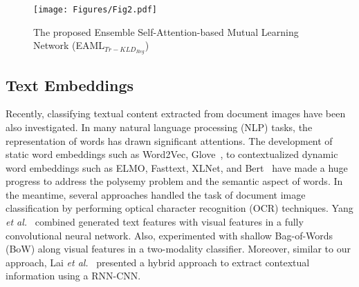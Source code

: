 \documentclass[twocolumn]{svjour3}
\newcommand{\etal}{\textit{et al.}}
\begin{document}
\begin{figure*}[ht]
\centering
  \texttt{[image: Figures/Fig2.pdf]}
  \caption{The proposed Ensemble Self-Attention-based Mutual Learning Network (EAML$_{{Tr-KLD}_{Reg}}$)}
    \label{fig:DAPML_architecture}
\end{figure*}


\subsection{Text Embeddings}

Recently, classifying textual content extracted from document images have been also investigated. In many natural language processing (NLP) tasks, the representation of words has drawn significant attentions. The development of static word embeddings such as Word2Vec, Glove~\cite{Mikolov2013EfficientEO, Pennington2014GloveGV}, to contextualized dynamic word embeddings such as ELMO, Fasttext, XLNet, and Bert~\cite{Peters2018DeepCW, Yang2019XLNetGA, Mikolov2018AdvancesIP, Devlin2019BERTPO} have made a huge progress to address the polysemy problem and the semantic aspect of words. In the meantime, several approaches handled the task of document image classification by performing optical character recognition (OCR) techniques. Yang \etal~\cite{Yang2017LearningTE} combined generated text features with visual features in a fully convolutional neural network. Also, \cite{Augereau2014ImprovingCO, Dauphinee2019ModularMA} experimented with shallow Bag-of-Words (BoW) along visual features in a two-modality classifier. Moreover, similar to our approach, Lai \etal~\cite{Lai2015RecurrentCN} presented a hybrid approach to extract contextual information using a RNN-CNN.
\end{document}
